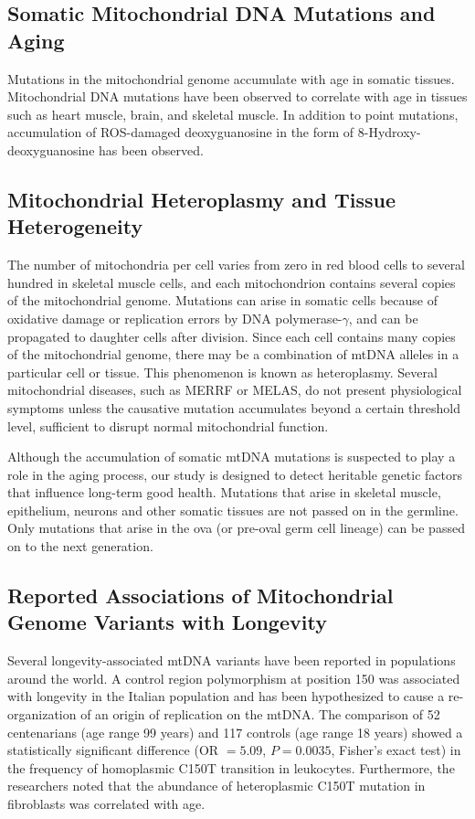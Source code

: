 \subsection{Somatic Mitochondrial DNA Mutations and Aging}
Mutations in the mitochondrial genome accumulate with age in somatic tissues. Mitochondrial DNA mutations have been observed to correlate with age in tissues such as heart muscle,\cite{hayakawa1992age} brain,\cite{soong1992mosaicism} and skeletal muscle\cite{melov1995marked}.  In addition to point mutations, accumulation of \ac{ROS}-damaged deoxyguanosine in the form of 8-Hydroxy-deoxyguanosine has been observed.

\subsection{Mitochondrial Heteroplasmy and Tissue Heterogeneity}
The number of mitochondria per cell varies from zero in red blood cells to several hundred in skeletal muscle cells, and each mitochondrion contains several copies of the mitochondrial genome.  Mutations can arise in somatic cells because of oxidative damage or replication errors by DNA polymerase-$\gamma$, and can be propagated to daughter cells after division.  Since each cell contains many copies of the mitochondrial genome, there may be a combination of mtDNA alleles in a particular cell or tissue\cite{Gyllensten2000,Li2010a}.  This phenomenon is known as heteroplasmy.  Several mitochondrial diseases, such as \ac{MERRF} or \ac{MELAS}, do not present physiological symptoms unless the causative mutation accumulates beyond a certain threshold level, sufficient to disrupt normal mitochondrial function\cite{Rossignol2003}.

Although the accumulation of somatic mtDNA mutations is suspected to play a role in the aging process, our study is designed to detect heritable genetic factors that influence long-term good health.  Mutations that arise in skeletal muscle, epithelium, neurons and other somatic tissues are not passed on in the germline.  Only mutations that arise in the ova (or pre-oval germ cell lineage) can be passed on to the next generation.

\subsection[Reported mtDNA Associations]{Reported Associations of Mitochondrial Genome Variants with Longevity}
Several longevity-associated mtDNA variants have been reported in populations around the world.  A control region polymorphism at position 150 was associated with longevity in the Italian population and has been hypothesized to cause a re-organization of an origin of replication on the mtDNA\cite{zhang2003strikingly}.  The comparison of 52 centenarians (age range 99 years) and 117 controls (age range 18 years) showed a statistically significant difference (\ac{OR} $=5.09$, $P=0.0035$, Fisher's exact test) in the frequency of homoplasmic C150T transition in leukocytes.  Furthermore, the researchers noted that the abundance of heteroplasmic C150T mutation in fibroblasts was correlated with age.  

